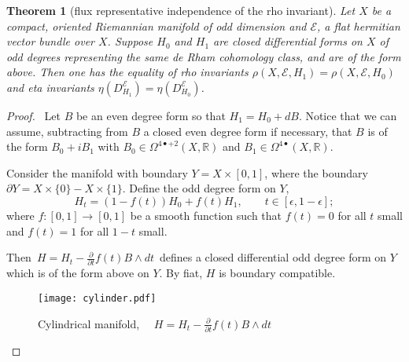 \documentclass[12pt]{amsart}
\theoremstyle{plain}
\newtheorem{theorem}{Theorem}[section]
\theoremstyle{definition}
\theoremstyle{remark}
\begin{document}
{\begin{theorem}[flux representative independence of the rho invariant]
\label{thm:indept-H}
Let $X$ be a compact, oriented Riemannian manifold of odd dimension and ${\mathcal E}$,
a flat hermitian vector bundle over $X$.
Suppose $H_0$ and $H_1$ are closed differential forms on $X$ of odd degrees
representing the same de Rham cohomology class, and are of the form above. 
Then one has the equality of rho invariants 
$\rho(X,{\mathcal E},H_1)=\rho(X,{\mathcal E},H_0)$ and eta invariants $\eta(D^{\mathcal E}_{H_1})
=\eta(D^{\mathcal E}_{H_0})$.
\end{theorem} 

\begin{proof}\
{{Let $B$ be an even degree
form so that $H_1=H_0+dB$. Notice that we can assume, subtracting from $B$ a closed even degree form if necessary, that $B$ is of the form $B_0+iB_1$ with $B_0\in \Omega^{4\bullet +2}(X,{\mathbb{R}})$ and $B_1\in \Omega^{4\bullet}(X,{\mathbb{R}})$.}}

Consider the manifold with boundary $Y = X \times [0, 1]$, where the boundary $\partial Y 
= X \times \{0\} - X \times \{1\}$. 
Define the odd degree form on $Y$,
$$
H_t  =  (1-f(t))H_0 + f(t) H_1,  \qquad t\in [\epsilon, 1-\epsilon];
$$
where $f: [0, 1] \to  [0, 1]$
be a smooth function such that $f (t)= 0$ for all $t$ small and $f (t)= 1$ for all $1-t$ small.

Then $\,H =H_t - \frac{\partial}{\partial t} f(t)B \wedge dt\,$ defines a closed differential {{odd}} degree form on $Y$ which is of the form above on $Y$. By fiat, $H$ is boundary compatible.

\begin{figure}[h]
\texttt{[image: cylinder.pdf]}\\
\caption{Cylindrical manifold, $\quad H= H_t - \frac{\partial}{\partial t} f(t) B \wedge dt$}
\label{fig:box-metric}
\end{figure}


\end{proof}}
\end{document}
